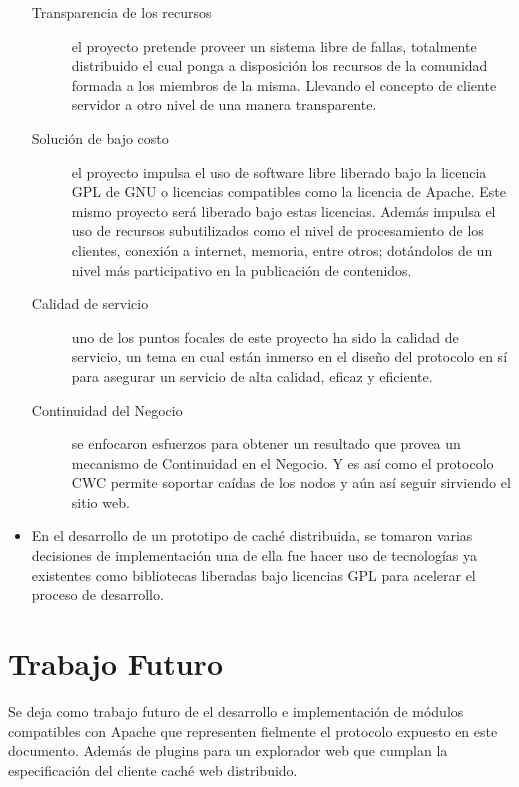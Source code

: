 \begin{itemize}
	\begin{description}
	\item[Transparencia de los recursos] el proyecto pretende proveer un sistema libre de fallas, totalmente distribuido el cual ponga a disposición los recursos de la comunidad formada a los miembros de la misma. Llevando el concepto de cliente servidor a otro nivel de una manera transparente. 
	
	\item [Solución de bajo costo] el proyecto impulsa el uso de software libre liberado bajo la licencia GPL de GNU o licencias compatibles como la licencia de Apache. Este mismo proyecto será liberado bajo estas licencias. Además impulsa el uso de recursos subutilizados como el nivel de procesamiento de los clientes, conexión a internet, memoria, entre otros; dotándolos de un nivel más participativo en la publicación de contenidos.
	
	\item [Calidad de servicio] uno de los puntos focales de este proyecto ha sido la calidad de servicio, un tema en cual están inmerso en el diseño del protocolo en sí para asegurar un servicio de alta calidad, eficaz y eficiente. 
	
	\item [Continuidad del Negocio] se enfocaron esfuerzos para obtener un resultado que provea un mecanismo de Continuidad en el Negocio. Y es así como el protocolo CWC permite soportar caídas de los nodos y aún así seguir sirviendo el sitio web.
	\end{description}

\item En el desarrollo de un prototipo de caché distribuida, se tomaron varias decisiones de implementación una de ella fue hacer uso de tecnologías ya existentes como bibliotecas liberadas bajo licencias GPL para acelerar el proceso de desarrollo. 
\end{itemize}


\section{Trabajo Futuro}

Se deja como trabajo futuro de el desarrollo e implementación de módulos compatibles con Apache que representen fielmente el protocolo expuesto en este documento. Además de plugins para un explorador web que cumplan la especificación del cliente caché web distribuido.

